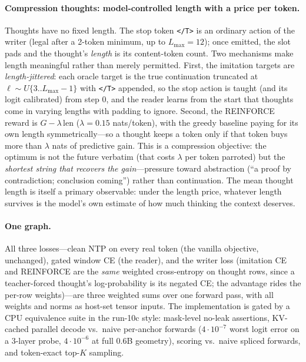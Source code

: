 \documentclass{article} %
\newcommand{\gain}{G}
\newcommand{\tend}{\texttt{</T>}}
\begin{document}
\paragraph{Compression thoughts: model-controlled length with a price per token.} Thoughts have no fixed length. The stop token \tend{} is an ordinary action of the writer (legal after a 2-token minimum, up to $L_{\max}{=}12$); once emitted, the slot pads and the thought's \emph{length} is its content-token count. Two mechanisms make length meaningful rather than merely permitted. First, the imitation targets are \emph{length-jittered}: each oracle target is the true continuation truncated at $\ell \sim U\{3..L_{\max}{-}1\}$ with \tend{} appended, so the stop action is taught (and its logit calibrated) from step 0, and the reader learns from the start that thoughts come in varying lengths with padding to ignore. Second, the REINFORCE reward is $\gain - \lambda\,\mathrm{len}$ ($\lambda{=}0.15$ nats/token), with the greedy baseline paying for its own length symmetrically---so a thought keeps a token only if that token buys more than $\lambda$ nats of predictive gain. This is a compression objective: the optimum is not the future verbatim (that costs $\lambda$ per token parroted) but the \emph{shortest string that recovers the gain}---pressure toward abstraction (``a proof by contradiction; conclusion coming'') rather than continuation. The mean thought length is itself a primary observable: under the length price, whatever length survives is the model's own estimate of how much thinking the context deserves.

\paragraph{One graph.} All three losses---clean NTP on every real token (the vanilla objective, unchanged), gated window CE (the reader), and the writer loss (imitation CE and REINFORCE are the \emph{same} weighted cross-entropy on thought rows, since a teacher-forced thought's log-probability is its negated CE; the advantage rides the per-row weights)---are three weighted sums over one forward pass, with all weights and norms as host-set tensor inputs. The implementation is gated by a CPU equivalence suite in the run-10c style: mask-level no-leak assertions, KV-cached parallel decode vs.\ naive per-anchor forwards ($4{\cdot}10^{-7}$ worst logit error on a 3-layer probe, $4{\cdot}10^{-6}$ at full 0.6B geometry), scoring vs.\ naive spliced forwards, and token-exact top-$K$ sampling.
\end{document}
